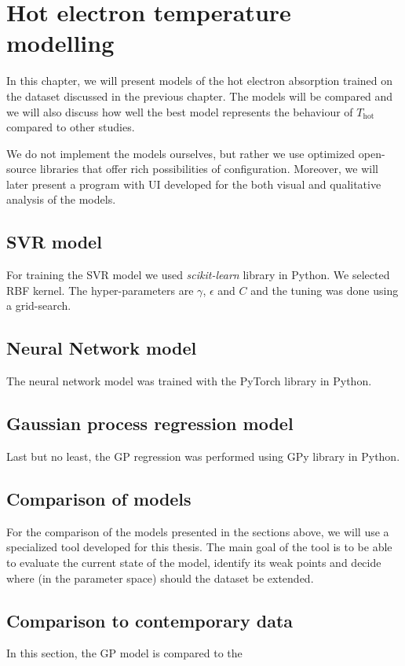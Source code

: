 \chapter{Hot electron temperature modelling}
In this chapter, we will present models of the hot electron absorption trained on the dataset discussed in the previous chapter. The models will be compared and we will also discuss how well the best model represents the behaviour of $T_{\mathrm{hot}}$ compared to other studies.

We do not implement the models ourselves, but rather we use optimized open-source libraries that offer rich possibilities of configuration. Moreover, we will later present a program with UI developed for the both visual and qualitative analysis of the models.

\section{SVR model}
For training the SVR model we used \textit{scikit-learn} library in Python. We selected RBF kernel. The hyper-parameters are $\gamma$, $\epsilon$ and $C$ and the tuning was done using a grid-search.

\section{Neural Network model}
The neural network model was trained with the PyTorch library in Python.

\section{Gaussian process regression model}
Last but no least, the GP regression was performed using GPy library in Python.

\section{Comparison of models}
For the comparison of the models presented in the sections above, we will use a specialized tool developed for this thesis. The main goal of the tool is to be able to evaluate the current state of the model, identify its weak points and decide where (in the parameter space) should the dataset be extended. 

\section{Comparison to contemporary data}
\label{ch:comparison}
In this section, the GP model is compared to the 